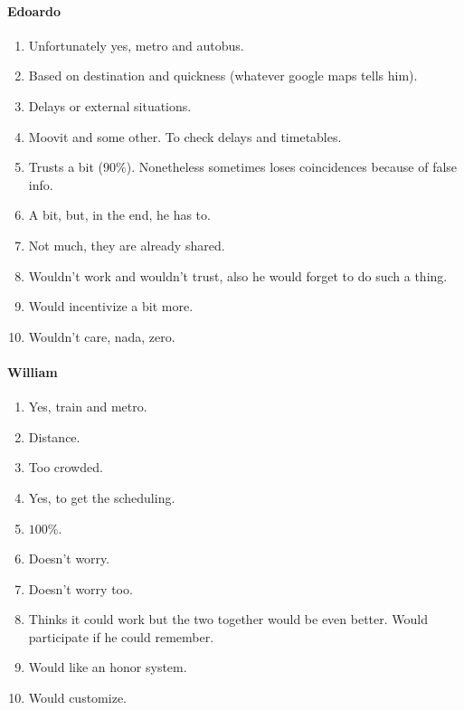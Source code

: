 \documentclass[a4paper, 10pt]{article}
\begin{document}
\paragraph*{Edoardo}
\begin{enumerate}
    \item Unfortunately yes, metro and autobus.
    \item Based on destination and quickness (whatever google maps tells him).
    \item Delays or external situations.
    \item Moovit and some other. To check delays and timetables.
    \item Trusts a bit ($90\%$). Nonetheless sometimes loses coincidences because of false info.
    \item A bit, but, in the end, he has to. 
    \item Not much, they are already shared.
    \item Wouldn't work and wouldn't trust, also he would forget to do such a thing.
    \item Would incentivize a bit more.
    \item Wouldn't care, nada, zero.
\end{enumerate}

\paragraph*{William}
\begin{enumerate}
    \item Yes, train and metro.
    \item Distance.
    \item Too crowded.
    \item Yes, to get the scheduling.
    \item $100\%$.
    \item Doesn't worry.
    \item Doesn't worry too.
    \item Thinks it could work but the two together would be even better. Would participate if he could remember.
    \item Would like an honor system.
    \item Would customize.
\end{enumerate}
\end{document}
